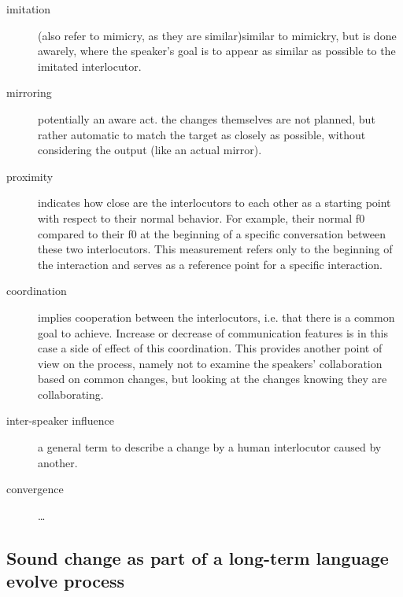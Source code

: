 \begin{description}
	\item[imitation] (also refer to mimicry, as they are similar)similar to mimickry, but is done awarely, where the speaker's goal is to appear as similar as possible to the imitated interlocutor.
	
	\item[mirroring] potentially an aware act. the changes themselves are not planned, but rather automatic to match the target as closely as possible, without considering the output (like an actual mirror).
	
	\item[proximity] indicates how close are the interlocutors to each other as a starting point with respect to their normal behavior.
	For example, their normal f0 compared to their f0 at the beginning of a specific conversation between these two interlocutors.
	This measurement refers only to the beginning of the interaction and serves as a reference point for a specific interaction.
	
	\item[coordination] implies cooperation between the interlocutors, i.e. that there is a common goal to achieve.
	Increase or decrease of communication features is in this case a side of effect of this coordination.
	This provides another point of view on the process, namely not to examine the speakers' collaboration based on common changes, but looking at the changes knowing they are collaborating.
	
	\item[inter-speaker influence] a general term to describe a change by a human interlocutor caused by another.
	
	\item[convergence] \ldots
\end{description}

\subsection[Long-term sound change]{Sound change as part of a long-term language evolve process}
\label{subsec:sound_change}

\citet{Ohala1989sound}\\
\citet{Ohala1990phonetics}\\
\citet{Ohala1993phonetics}\\ %

